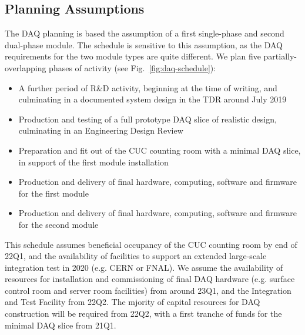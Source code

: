 \subsection{Planning Assumptions}
\label{sec:fd-daq-org-assmp}

The DAQ planning is based the assumption of a first single-phase and second dual-phase module. The schedule is sensitive to this assumption, as the DAQ requirements for the two module types are quite different. We plan five partially-overlapping phases of activity (see Fig.~\ref{fig:daq-schedule}):

\begin{itemize}
	\item A further period of R\&D activity, beginning at the time of writing, and culminating in a documented system design in the TDR around July 2019
	\item Production and testing of a full prototype DAQ slice of realistic design, culminating in an Engineering Design Review
	\item Preparation and fit out of the CUC counting room with a minimal DAQ slice, in support of the first module installation
	\item Production and delivery of final hardware, computing, software and firmware for the first module
	\item Production and delivery of final hardware, computing, software and firmware for the second module
\end{itemize}

This schedule assumes beneficial occupancy of the CUC counting room by end of 22Q1, and the availability of facilities to support an extended large-scale integration test in 2020 (e.g. CERN or FNAL). We assume the availability of resources for installation and commissioning of final DAQ hardware (e.g. surface control room and server room facilities) from around 23Q1, and the Integration and Test Facility from 22Q2. The mjority of capital resources for DAQ construction will be required from 22Q2, with a first tranche of funds for the minimal DAQ slice from 21Q1.



